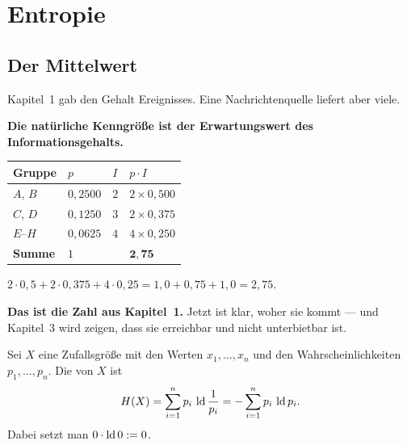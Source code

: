 \chapter{Entropie}

\section{Der Mittelwert}

\begin{merksatz}
Kapitel~1 gab den Gehalt  Ereignisses. Eine Nachrichtenquelle liefert aber viele.

\begin{center}
\begin{minipage}{0.9\textwidth}
\textbf{Die natürliche Kenngröße ist der Erwartungswert des Informationsgehalts.}
\end{minipage}
\end{center}

\begin{center}
{\small
\renewcommand{\arraystretch}{1.48}
\begin{tabular}{@{}P{1.8cm}P{1.6cm}P{1.6cm}P{2.2cm}@{}}
\toprule
\textbf{Gruppe} & $p$ & $I$ & $p\cdot I$\\
\midrule
$A$, $B$ & $0{,}2500$ & $2$ & $2\times0{,}500$\\
$C$, $D$ & $0{,}1250$ & $3$ & $2\times0{,}375$\\
$E$--$H$ & $0{,}0625$ & $4$ & $4\times0{,}250$\\
\midrule
\textbf{Summe} & $1$ & & $\mathbf{2{,}75}$\\
\bottomrule
\end{tabular}}
\end{center}

 $2\cdot0{,}5 + 2\cdot0{,}375 + 4\cdot0{,}25 = 1{,}0 + 0{,}75 + 1{,}0 = 2{,}75$.

\begin{center}
\begin{minipage}{0.9\textwidth}
\textbf{Das ist die Zahl aus Kapitel~1.} Jetzt ist klar, woher sie kommt --- und Kapitel~3 wird zeigen, dass sie erreichbar und nicht unterbietbar ist.
\end{minipage}
\end{center}
\end{merksatz}

\begin{definition}
Sei $X$ eine Zufallsgröße mit den Werten $x_1,\ldots,x_n$ und den Wahrscheinlichkeiten $p_1,\ldots,p_n$. Die  von $X$ ist
\[ H(X) = \sum_{i=1}^{n} p_i\,\operatorname{ld}\frac{1}{p_i} = -\sum_{i=1}^{n} p_i\,\operatorname{ld} p_i . \]
Dabei setzt man $0\cdot\operatorname{ld} 0 := 0$.
\end{definition}

